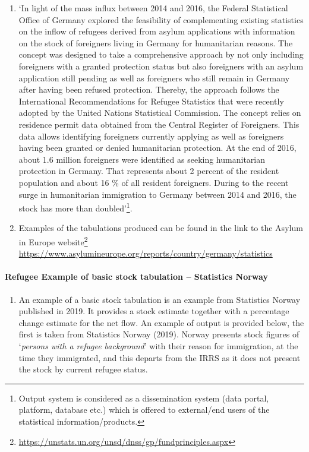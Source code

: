 \documentclass[
]{article}
\providecommand{\tightlist}{%
  \setlength{\itemsep}{0pt}\setlength{\parskip}{0pt}}
\begin{document}
\begin{enumerate}
\def\labelenumi{\arabic{enumi}.}
\setcounter{enumi}{409}
\item
  `In light of the mass influx between 2014 and 2016, the Federal
  Statistical Office of Germany explored the feasibility of
  complementing existing statistics on the inflow of refugees derived
  from asylum applications with information on the stock of foreigners
  living in Germany for humanitarian reasons. The concept was designed
  to take a comprehensive approach by not only including foreigners
  with a granted protection status but also foreigners with an asylum
  application still pending as well as foreigners who still remain in
  Germany after having been refused protection. Thereby, the approach
  follows the International Recommendations for Refugee Statistics
  that were recently adopted by the United Nations Statistical
  Commission. The concept relies on residence permit data obtained
  from the Central Register of Foreigners. This data allows
  identifying foreigners currently applying as well as foreigners
  having been granted or denied humanitarian protection. At the end of
  2016, about 1.6 million foreigners were identified as seeking
  humanitarian protection in Germany. That represents about 2 percent
  of the resident population and about 16 \% of all resident
  foreigners. During to the recent surge in humanitarian immigration
  to Germany between 2014 and 2016, the stock has more than
  doubled'\footnote{Output system is considered as a dissemination system (data
    portal, platform, database etc.) which is offered to external/end
    users of the statistical information/products.}.
\item
  Examples of the tabulations produced can be found in the link to
  the Asylum in Europe website\footnote{\url{https://unstats.un.org/unsd/dnss/gp/fundprinciples.aspx}}
  \url{https://www.asylumineurope.org/reports/country/germany/statistics}
\end{enumerate}

\hypertarget{refugee-example-of-basic-stock-tabulation-statistics-norway}{%
\paragraph{Refugee Example of basic stock tabulation -- Statistics Norway}\label{refugee-example-of-basic-stock-tabulation-statistics-norway}}

\begin{enumerate}
\def\labelenumi{\arabic{enumi}.}
\setcounter{enumi}{411}
\tightlist
\item
  An example of a basic stock tabulation is an example from
  Statistics Norway published in 2019. It provides a stock estimate
  together with a percentage change estimate for the net flow. An
  example of output is provided below, the first is taken from
  Statistics Norway (2019). Norway presents stock figures of `\emph{persons
  with a refugee background}' with their reason for immigration, at
  the time they immigrated, and this departs from the IRRS as it does
  not present the stock by current refugee status.
\end{enumerate}
\end{document}
